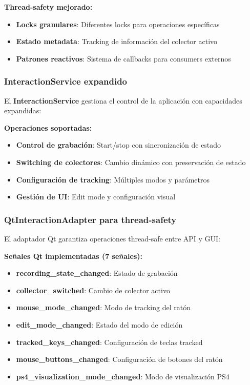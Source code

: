 \textbf{Thread-safety mejorado:}
\begin{itemize}
    \item \textbf{Locks granulares}: Diferentes locks para operaciones específicas
    \item \textbf{Estado metadata}: Tracking de información del colector activo
    \item \textbf{Patrones reactivos}: Sistema de callbacks para consumers externos
\end{itemize}

\subsubsection{InteractionService expandido}

El \textbf{InteractionService} gestiona el control de la aplicación con capacidades expandidas:

\textbf{Operaciones soportadas:}
\begin{itemize}
    \item \textbf{Control de grabación}: Start/stop con sincronización de estado
    \item \textbf{Switching de colectores}: Cambio dinámico con preservación de estado
    \item \textbf{Configuración de tracking}: Múltiples modos y parámetros
    \item \textbf{Gestión de UI}: Edit mode y configuración visual
\end{itemize}

\subsubsection{QtInteractionAdapter para thread-safety}

El adaptador Qt garantiza operaciones thread-safe entre API y GUI:

\textbf{Señales Qt implementadas (7 señales):}
\begin{itemize}
    \item \textbf{recording\_state\_changed}: Estado de grabación
    \item \textbf{collector\_switched}: Cambio de colector activo
    \item \textbf{mouse\_mode\_changed}: Modo de tracking del ratón
    \item \textbf{edit\_mode\_changed}: Estado del modo de edición
    \item \textbf{tracked\_keys\_changed}: Configuración de teclas tracked
    \item \textbf{mouse\_buttons\_changed}: Configuración de botones del ratón
    \item \textbf{ps4\_visualization\_mode\_changed}: Modo de visualización PS4
\end{itemize}


